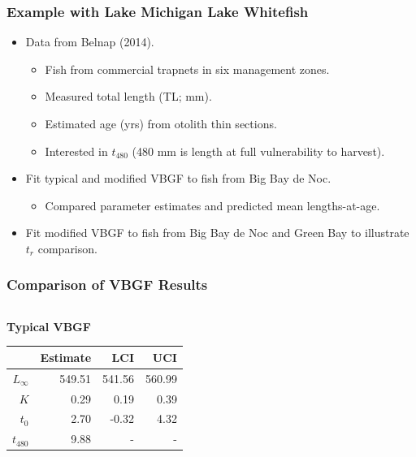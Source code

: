 \documentclass[xcolor=dvipsnames,t]{beamer}\usepackage[]{graphicx}\usepackage[]{color}
\begin{document}
\begin{frame}[fragile]
\frametitle{Example with Lake Michigan Lake Whitefish}
\begin{itemize}
  \item Data from Belnap (2014).\footnotemark
  \begin{itemize}
    \item Fish from commercial trapnets in six management zones.
    \item Measured total length (TL; mm).
    \item Estimated age (yrs) from otolith thin sections.
    \item Interested in $t_{480}$ (480 mm is length at full vulnerability to harvest).
  \end{itemize}
  \pause
  \bigskip
  \item Fit typical and modified VBGF to fish from Big Bay de Noc.
  \begin{itemize}
    \item Compared parameter estimates and predicted mean lengths-at-age.
  \end{itemize}
  \pause
  \smallskip
  \item Fit modified VBGF to fish from Big Bay de Noc and Green Bay to illustrate $t_{r}$ comparison.\footnotemark
\end{itemize}
\end{frame}


\begin{frame}[fragile]
\frametitle{Comparison of VBGF Results}
\begin{columns}
\begin{column}{0.5\textwidth}
\textbf{Typical VBGF}
\begin{table}[ht]
\centering
\begin{tabular}{rrrr}
  \hline
 & Estimate & LCI & UCI \\ 
  \hline
$L_{\infty}$ & 549.51 & 541.56 & 560.99 \\ 
  $K$ & 0.29 & 0.19 & 0.39 \\ 
  $t_{0}$ & 2.70 & -0.32 & 4.32 \\ 
  $t_{480}$ & 9.88 & - & - \\ 
   \hline
\end{tabular}
\end{table}

\end{column}
\begin{column}{0.5\textwidth}
\end{column}
\end{columns}
\end{frame}
\end{document}
